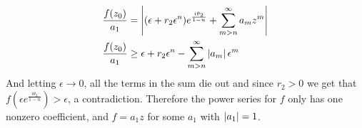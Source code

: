 \documentclass{homework}
\begin{document}
\begin{solution}
\begin{align*}
                                                                                                                                                                                                                                                                              \frac{f(z_0)}{a_1}  &= \left|(\epsilon+r_2\epsilon^n)e^{\frac{i\theta_2}{1-n}} + \sum_{m>n}^\infty a_mz^m\right|\\
                                                                                                                                                                                                                                                                              \frac{f(z_0)}{a_1}  &\geq \epsilon+r_2\epsilon^n - \sum_{m>n}^\infty \left|a_m\right|\epsilon^{m}
                                                                                                                                                                                                                                                                              \end{align*}
                                                                                                                                                                                                                                                                              And letting $\epsilon\to 0$, all the terms in the sum die out and since $r_2>0$ we get that $f(\epsilon e^{\frac{i\theta_2}{1-n}}) > \epsilon$, a contradiction. Therefore the power series for $f$ only has one nonzero coefficient, and $f = a_1z$ for some $a_1$ with $\left|a_1\right| = 1$.
                                                                                                                                                                                                                                                                              \end{solution}
\end{document}
